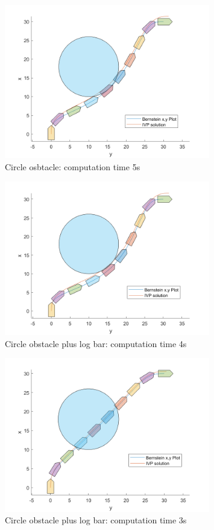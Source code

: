 \begin{figure}[h!]
\centering
\includegraphics[width=0.8\textwidth]{Images/results/circleobstacle.png}
\caption{Circle osbtacle: computation time 5s}
\label{fig:circleobstacle}
\end{figure}

\begin{figure}[h!]
\centering
\includegraphics[width=0.8\textwidth]{Images/results/circleobstaclelogbargood.png}
\caption{Circle obstacle plus log bar: computation time 4s}
\label{fig:circleobstaclelogbargood}
\end{figure}

\begin{figure}[h!]
\centering
\includegraphics[width=0.8\textwidth]{Images/results/circleobstaclelogbarbad.png}
\caption{Circle obstacle plus log bar: computation time 3s}
\label{fig:circleobstaclelogbarbad}
\end{figure}

